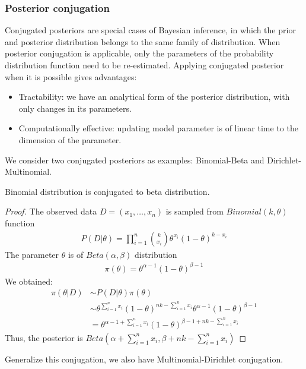 \subsubsection{Posterior conjugation}
Conjugated posteriors are special cases of Bayesian inference, in which the prior and posterior
distribution belongs to the same family of distribution. When posterior conjugation is applicable,
only the parameters of the probability distribution function need to be re-estimated. Applying
conjugated posterior when it is possible gives advantages:
\begin{itemize}
    \item Tractability: we have an analytical form of the posterior distribution, with only changes
          in its parameters.
    \item Computationally effective: updating model parameter is of linear time to the dimension of
          the parameter.
\end{itemize}
We consider two conjugated posteriors as examples: Binomial-Beta and Dirichlet-Multinomial.
\begin{lemma}
    Binomial distribution is conjugated to beta distribution.
\end{lemma}
\begin{proof}
    The observed data $D=(x_1,\ldots,x_n)$ is sampled from $Binomial(k, \theta)$ function
    \begin{align*}
        P(D|\theta) = \prod_{i=1}^n{k\choose x_i}\theta^{x_i}(1-\theta)^{k-x_i}
    \end{align*}
    The parameter $\theta$ is of $Beta(\alpha, \beta)$ distribution
    \begin{align*}
        \pi(\theta) = \theta^{\alpha-1}(1-\theta)^{\beta -1}
    \end{align*}
    We obtained:
    \begin{align*}
        \pi(\theta|D) & \sim P(D|\theta)\pi(\theta)                                                                             \\
                      & \sim \theta^{\sum_{i=1}^n x_i}(1-\theta)^{nk -\sum_{i=1}^n x_i} \theta^{\alpha -1} (1-\theta)^{\beta-1} \\
                      & = \theta^{\alpha - 1 + \sum_{i=1}^n x_i}(1-\theta)^{\beta - 1 + nk -\sum_{i=1}^n x_i}
    \end{align*}
    Thus, the posterior is $Beta(\alpha + \sum_{i=1}^n x_i, \beta + nk -\sum_{i=1}^n x_i)$
\end{proof}
Generalize this conjugation, we also have Multinomial-Dirichlet conjugation.
